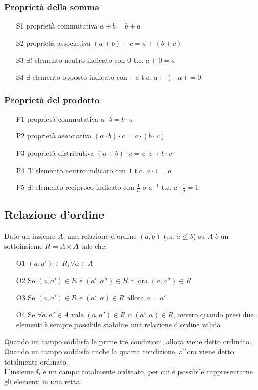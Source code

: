 \documentclass[a4paper]{article}
\begin{document}
\subsubsection*{Proprietà della somma}
\begin{itemize}
	\item[S1] proprietà commutativa \(a + b =  b + a\)
	\item[S2] proprietà associativa \((a + b) + c = a + (b + c)\)
	\item[S3] \(\exists!\) elemento neutro indicato con \(0\) t.c. \(a + 0 = a\)
	\item[S4] \(\exists\) elemento opposto indicato con \(-a\) t.c. \(a + (-a) = 0\)
\end{itemize}

\subsubsection*{Proprietà del prodotto}
\begin{itemize}
	\item[P1] proprietà commutativa \(a \cdot b =  b \cdot a\)
	\item[P2] proprietà associativa \((a \cdot b) \cdot c = a \cdot (b \cdot c)\)
	\item[P3] proprietà distributiva \((a + b) \cdot c  = a \cdot c + b \cdot c\)
	\item[P4] \(\exists!\) elemento neutro indicato con \(1\) t.c. \(a \cdot 1 = a\)
	\item[P5] \(\exists!\) elemento reciproco indicato con \(\displaystyle \frac{1}{a}\) o \(a ^ {-1}\) t.c. \(a \cdot \displaystyle \frac{1}{a} = 1\)
\end{itemize}

\subsection{Relazione d'ordine}
Dato un insieme \(A\), una relazione d'ordine \((a, b)\) (es. \(a \leq b\)) su \(A\) è un sottoinsieme \(R = A \times A\) tale che:
\begin{itemize}
	\item[O1] \((a, a') \in R, \forall a \in A\)
	\item[O2] Se \((a, a') \in R\) e \((a', a'') \in R\) allora \((a, a'') \in R\)
	\item[O3] Se \((a, a') \in R\) e \((a', a) \in R\) allora \(a = a'\)
	\item[O4] Se \(\forall a,a' \in A\) vale \((a, a') \in R\) o \((a', a) \in R\), ovvero quando presi due elementi è sempre possibile stabilire una relazione d'ordine valida 
\end{itemize}
Quando un campo soddisfa le prime tre condizioni, allora viene detto ordinato.
Quando un campo soddisfa anche la quarta condizione, allora viene detto totalmente ordinato. \\
L'insieme \(\mathbb{Q}\) è un campo totalmente ordinato, per cui è possibile rappresentarne gli elementi in una retta.
\end{document}
